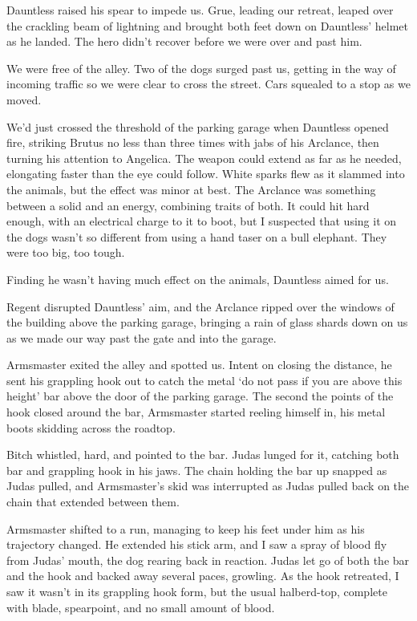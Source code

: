 Dauntless raised his spear to impede us.  Grue, leading our retreat, leaped over the crackling beam of lightning and brought both feet down on Dauntless' helmet as he landed.  The hero didn't recover before we were over and past him.



We were free of the alley.  Two of the dogs surged past us, getting in the way of incoming traffic so we were clear to cross the street.  Cars squealed to a stop as we moved.



We'd just crossed the threshold of the parking garage when Dauntless opened fire, striking Brutus no less than three times with jabs of his Arclance, then turning his attention to Angelica.  The weapon could extend as far as he needed, elongating faster than the eye could follow.  White sparks flew as it slammed into the animals, but the effect was minor at best.  The Arclance was something between a solid and an energy, combining traits of both.  It could hit hard enough, with an electrical charge to it to boot, but I suspected that using it on the dogs wasn't so different from using a hand taser on a bull elephant.  They were too big, too tough.



Finding he wasn't having much effect on the animals, Dauntless aimed for us.



Regent disrupted Dauntless' aim, and the Arclance ripped over the windows of the building above the parking garage, bringing a rain of glass shards down on us as we made our way past the gate and into the garage.



Armsmaster exited the alley and spotted us.  Intent on closing the distance, he sent his grappling hook out to catch the metal `do not pass if you are above this height' bar above the door of the parking garage.  The second the points of the hook closed around the bar, Armsmaster started reeling himself in, his metal boots skidding across the roadtop.



Bitch whistled, hard, and pointed to the bar.  Judas lunged for it, catching both bar and grappling hook in his jaws.  The chain holding the bar up snapped as Judas pulled, and Armsmaster's skid was interrupted as Judas pulled back on the chain that extended between them.



Armsmaster shifted to a run, managing to keep his feet under him as his trajectory changed.  He extended his stick arm, and I saw a spray of blood fly from Judas' mouth, the dog rearing back in reaction.  Judas let go of both the bar and the hook and backed away several paces, growling.  As the hook retreated, I saw it wasn't in its grappling hook form, but the usual halberd-top, complete with blade, spearpoint, and no small amount of blood.



